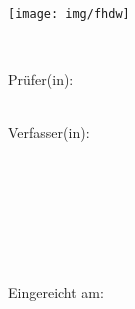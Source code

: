 
\begin{titlepage}
\begin{center}

\texttt{[image: img/fhdw]}\\

\vspace{7mm}

\Huge{\bfseries\dokumententyp}

\vspace{5mm}\\

\LARGE{\dokumententitel}


\large{

\vspace{15mm}

Prüfer(in):\\

\dokumentenpruefer\\

\vspace{15mm}

Verfasser(in):\\

\dokumentenautor\\

\martikelnummer\\

\vspace{3mm}

\dokumentenautoradress\\

\vspace{7mm}

\studiengang\\

\spezialisierungsbereich\\

\enlargethispage{2em}

\vspace{10mm}

Eingereicht am:\vspace{1mm}\\

\abgabedatum

}

\end{center}


\end{titlepage}

